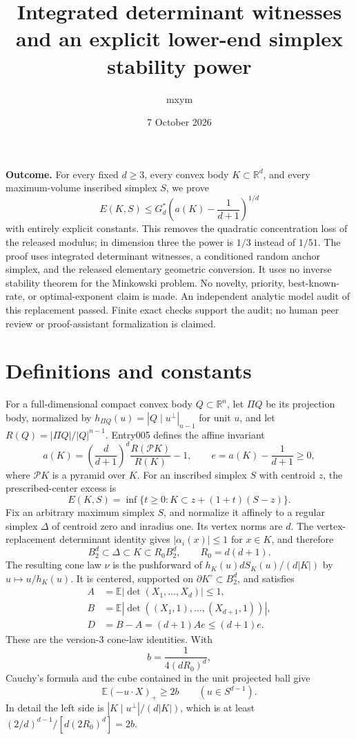 \documentclass[11pt]{article}
\title{Integrated determinant witnesses and an explicit lower-end simplex stability power}
\author{mxym}
\date{7 October 2026}
\newcommand{\E}{\mathbb E}
\newcommand{\B}{B_2^d}
\newcommand{\pos}[1]{(#1)_+}
\begin{document}
\maketitle

\noindent\textbf{Outcome.}
For every fixed $d\ge3$, every convex body $K\subset\mathbb R^d$, and every
maximum-volume inscribed simplex $S$, we prove
\[
 E(K,S)\le G_d^*\left(a(K)-\frac1{d+1}\right)^{1/d}
\]
with entirely explicit constants. This removes the quadratic concentration
loss of the released modulus; in dimension three the power is $1/3$ instead
of $1/51$. The proof uses integrated determinant witnesses, a conditioned
random anchor simplex, and the released elementary geometric conversion.
It uses no inverse stability theorem for the Minkowski problem. No novelty,
priority, best-known-rate, or optimal-exponent claim is made. An independent analytic model audit of this replacement passed. Finite exact
checks support the audit; no human peer review or proof-assistant formalization
is claimed.

\section{Definitions and constants}

For a full-dimensional compact convex body $Q\subset\mathbb R^n$, let
$\Pi Q$ be its projection body, normalized by
$h_{\Pi Q}(u)=|Q\mid u^\perp|_{n-1}$ for unit $u$, and let
$R(Q)=|\Pi Q|/|Q|^{n-1}$. Entry005 defines the affine invariant
\[
 a(K)=\left(\frac d{d+1}\right)^d\frac{R(\mathcal P K)}{R(K)}-1,
 \qquad e=a(K)-\frac1{d+1}\ge0,
\]
where $\mathcal P K$ is a pyramid over $K$. For an inscribed simplex $S$
with centroid $z$, the prescribed-center excess is
\[
 E(K,S)=\inf\{t\ge0:K\subset z+(1+t)(S-z)\}.
\]
Fix an arbitrary maximum simplex $S$, and normalize it affinely to a
regular simplex $\Delta$ of centroid zero and inradius one. Its vertex
norms are $d$. The vertex-replacement determinant identity gives
$|\alpha_i(x)|\le1$ for $x\in K$, and therefore
\[
 \B\subset\Delta\subset K\subset R_0\B,\qquad R_0=d(d+1).
 \tag{1}
\]
The resulting cone law $\nu$ is the pushforward of
$h_K(u)dS_K(u)/(d|K|)$ by $u\mapsto u/h_K(u)$. It is centered, supported
on $\partial K^\circ\subset\B$, and satisfies
\begin{align*}
 A&=\E|\det(X_1,\ldots,X_d)|\le1,\\
 B&=\E|\det((X_1,1),\ldots,(X_{d+1},1))|,\\
 D&=B-A=(d+1)Ae\le(d+1)e.
\end{align*}
These are the version-3 cone-law identities. With
\[
 b=\frac1{4(dR_0)^d},
 \tag{2}
\]
Cauchy's formula and the cube contained in the unit projected ball give
\[
 \E\pos{-u\cdot X}\ge2b\qquad (u\in S^{d-1}).
 \tag{3}
\]
In detail the left side is $|K\mid u^\perp|/(d|K|)$, which is at least
$(2/d)^{d-1}/[d(2R_0)^d]=2b$.
\end{document}
